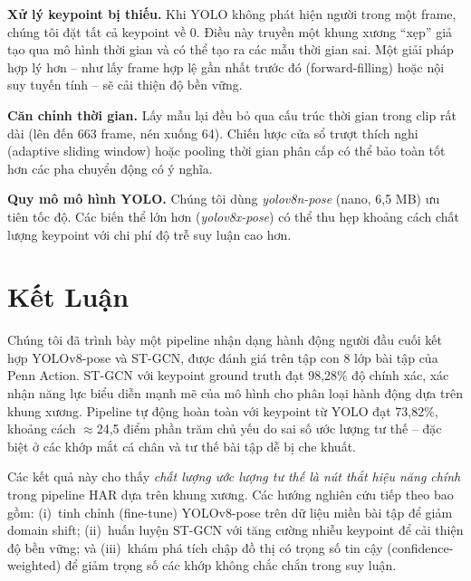 \documentclass[conference]{IEEEtran}
\begin{document}
\textbf{Xử lý keypoint bị thiếu.} Khi YOLO không phát hiện người trong một frame,
chúng tôi đặt tất cả keypoint về 0. Điều này truyền một khung xương ``xẹp'' giả
tạo qua mô hình thời gian và có thể tạo ra các mẫu thời gian sai. Một giải pháp
hợp lý hơn -- như lấy frame hợp lệ gần nhất trước đó (forward-filling) hoặc nội
suy tuyến tính -- sẽ cải thiện độ bền vững.

\textbf{Căn chỉnh thời gian.} Lấy mẫu lại đều bỏ qua cấu trúc thời gian trong
clip rất dài (lên đến 663 frame, nén xuống 64). Chiến lược cửa sổ trượt thích
nghi (adaptive sliding window) hoặc pooling thời gian phân cấp có thể bảo toàn
tốt hơn các pha chuyển động có ý nghĩa.

\textbf{Quy mô mô hình YOLO.} Chúng tôi dùng \textit{yolov8n-pose} (nano, 6,5
MB) ưu tiên tốc độ. Các biến thể lớn hơn (\textit{yolov8x-pose}) có thể thu hẹp
khoảng cách chất lượng keypoint với chi phí độ trễ suy luận cao hơn.

\section{Kết Luận}
\label{sec:conclusion}

Chúng tôi đã trình bày một pipeline nhận dạng hành động người đầu cuối kết hợp
YOLOv8-pose và ST-GCN, được đánh giá trên tập con 8 lớp bài tập của Penn Action.
ST-GCN với keypoint ground truth đạt 98,28\% độ chính xác, xác nhận năng lực biểu
diễn mạnh mẽ của mô hình cho phân loại hành động dựa trên khung xương. Pipeline
tự động hoàn toàn với keypoint từ YOLO đạt 73,82\%, khoảng cách $\approx$24,5
điểm phần trăm chủ yếu do sai số ước lượng tư thế -- đặc biệt ở các khớp mắt cá
chân và tư thế bài tập dễ bị che khuất.

Các kết quả này cho thấy \textit{chất lượng ước lượng tư thế là nút thắt hiệu
năng chính} trong pipeline HAR dựa trên khung xương. Các hướng nghiên cứu tiếp
theo bao gồm: (i)~tinh chỉnh (fine-tune) YOLOv8-pose trên dữ liệu miền bài tập
để giảm domain shift; (ii)~huấn luyện ST-GCN với tăng cường nhiễu keypoint để
cải thiện độ bền vững; và (iii)~khám phá tích chập đồ thị có trọng số tin cậy
(confidence-weighted) để giảm trọng số các khớp không chắc chắn trong suy luận.
\end{document}
